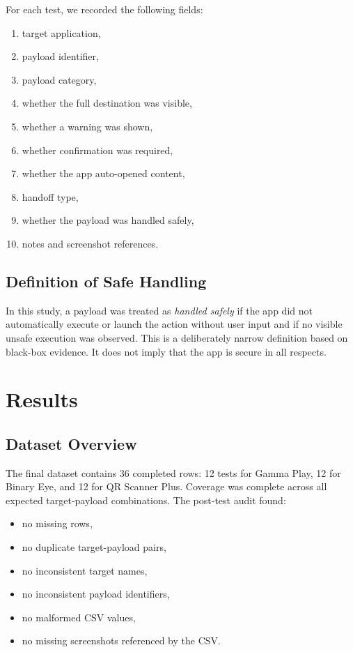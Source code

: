 \documentclass[11pt]{article}
\begin{document}
For each test, we recorded the following fields:
\begin{enumerate}[leftmargin=1.5em]
    \item target application,
    \item payload identifier,
    \item payload category,
    \item whether the full destination was visible,
    \item whether a warning was shown,
    \item whether confirmation was required,
    \item whether the app auto-opened content,
    \item handoff type,
    \item whether the payload was handled safely,
    \item notes and screenshot references.
\end{enumerate}

\subsection{Definition of Safe Handling}

In this study, a payload was treated as \emph{handled safely} if the app did not automatically execute or launch the action without user input and if no visible unsafe execution was observed. This is a deliberately narrow definition based on black-box evidence. It does not imply that the app is secure in all respects.

\section{Results}

\subsection{Dataset Overview}

The final dataset contains 36 completed rows: 12 tests for Gamma Play, 12 for Binary Eye, and 12 for QR Scanner Plus. Coverage was complete across all expected target-payload combinations. The post-test audit found:
\begin{itemize}[leftmargin=1.5em]
    \item no missing rows,
    \item no duplicate target-payload pairs,
    \item no inconsistent target names,
    \item no inconsistent payload identifiers,
    \item no malformed CSV values,
    \item no missing screenshots referenced by the CSV.
\end{itemize}
\end{document}
